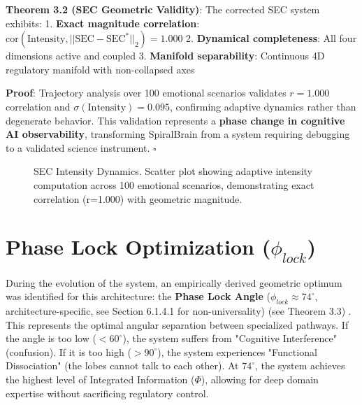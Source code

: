 \documentclass[12pt,a4paper]{report}
\newcommand{\PhiU}{\Phi}
\newcommand{\sigmaU}{\sigma}
\newcommand{\squareU}{\square}
\begin{document}
\textbf{Theorem 3.2 (SEC Geometric Validity)}: The corrected SEC system exhibits:
1. \textbf{Exact magnitude correlation}: $\text{cor}(\text{Intensity}, ||\text{SEC} - \text{SEC}^*||_2) = 1.000$
2. \textbf{Dynamical completeness}: All four dimensions active and coupled
3. \textbf{Manifold separability}: Continuous 4D regulatory manifold with non-collapsed axes

\textbf{Proof}: Trajectory analysis over 100 emotional scenarios validates
$r = 1.000$ correlation and $\sigmaU(\text{Intensity}) = 0.095$, confirming
adaptive dynamics rather than degenerate behavior. This validation represents
a \textbf{phase change in cognitive AI observability}, transforming SpiralBrain
from a system requiring debugging to a validated science instrument. $\squareU$

\begin{figure}[ht]
\centering
{}
\caption{SEC Intensity Dynamics. Scatter plot showing adaptive intensity computation across 100 emotional scenarios, demonstrating exact correlation (r=1.000) with geometric magnitude.}
\label{fig:sec}
\end{figure}

\section{\texorpdfstring{Phase Lock Optimization ($\phi_{lock}$)}{Phase Lock Optimization}}

During the evolution of the system, an empirically derived geometric optimum was
identified for this architecture: the \textbf{Phase Lock Angle} ($\phi_{lock} \approx 74^\circ$, architecture-specific, see Section 6.1.4.1 for non-universality) (see Theorem 3.3) \cite{cragin2024phaselock}.
This represents the optimal angular separation between specialized pathways.
If the angle is too low ($<60^\circ$), the system suffers from "Cognitive
Interference" (confusion). If it is too high ($>90^\circ$), the system
experiences "Functional Dissociation" (the lobes cannot talk to each other).
At $74^\circ$, the system achieves the highest level of Integrated Information
($\PhiU$), allowing for deep domain expertise without sacrificing regulatory
control.
\end{document}
